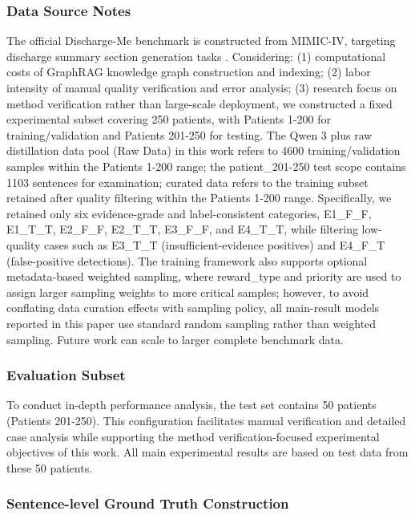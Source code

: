 \documentclass[11pt]{article}
\begin{document}
\subsubsection{Data Source Notes}

The official Discharge-Me benchmark is constructed from MIMIC-IV, targeting discharge summary section generation tasks \citep{stanfordaimi2024dischargeMe,xu2024dischargeMeSharedTask}. Considering: (1) computational costs of GraphRAG knowledge graph construction and indexing; (2) labor intensity of manual quality verification and error analysis; (3) research focus on method verification rather than large-scale deployment, we constructed a fixed experimental subset covering 250 patients, with Patients 1-200 for training/validation and Patients 201-250 for testing. The Qwen 3 plus raw distillation data pool (Raw Data) in this work refers to 4600 training/validation samples within the Patients 1-200 range; the patient\_201-250 test scope contains 1103 sentences for examination; curated data refers to the training subset retained after quality filtering within the Patients 1-200 range. Specifically, we retained only six evidence-grade and label-consistent categories, E1\_F\_F, E1\_T\_T, E2\_F\_F, E2\_T\_T, E3\_F\_F, and E4\_T\_T, while filtering low-quality cases such as E3\_T\_T (insufficient-evidence positives) and E4\_F\_T (false-positive detections). The training framework also supports optional metadata-based weighted sampling, where reward\_type and priority are used to assign larger sampling weights to more critical samples; however, to avoid conflating data curation effects with sampling policy, all main-result models reported in this paper use standard random sampling rather than weighted sampling. Future work can scale to larger complete benchmark data.

\subsubsection{Evaluation Subset}

To conduct in-depth performance analysis, the test set contains 50 patients (Patients 201-250). This configuration facilitates manual verification and detailed case analysis while supporting the method verification-focused experimental objectives of this work. All main experimental results are based on test data from these 50 patients.

\subsubsection{Sentence-level Ground Truth Construction}
\end{document}

